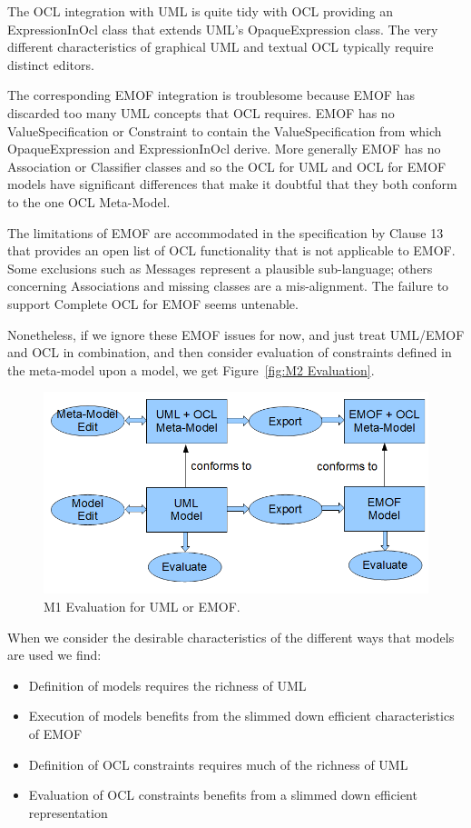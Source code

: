 \documentclass{eceasst}
\begin{document}
The OCL integration with UML is quite tidy with OCL providing an ExpressionInOcl class that extends UML's OpaqueExpression class. The very different characteristics of graphical UML and textual OCL typically require distinct editors.

The corresponding EMOF integration is troublesome because EMOF has discarded too many UML concepts that OCL requires. EMOF has no ValueSpecification or Constraint to contain the ValueSpecification from which OpaqueExpression and ExpressionInOcl derive. More generally EMOF has no Association or Classifier classes and so the OCL for UML and OCL for EMOF models have significant differences that make it doubtful that they both conform to the one OCL Meta-Model.

The limitations of EMOF are accommodated in the specification by Clause 13 that provides an open list of OCL functionality that is not applicable to EMOF. Some exclusions such as Messages represent a plausible sub-language; others concerning Associations and missing classes are a mis-alignment. The failure to support Complete OCL for EMOF seems untenable.

Nonetheless, if we ignore these EMOF issues for now, and just treat UML/EMOF and OCL in combination, and then consider evaluation of constraints defined in the meta-model upon a model, we get Figure~\ref{fig:M2 Evaluation}.

\begin{figure}
  \begin{center}
    \includegraphics[width=4.5in]{M2Evaluation.png}
  \end{center}
  \caption{M1 Evaluation for UML or EMOF.}
  \label{fig:M2Evaluation}
\end{figure}

When we consider the desirable characteristics of the different ways that models are used we find:
\begin{itemize}
\item Definition of models requires the richness of UML
\item Execution of models benefits from the slimmed down efficient characteristics of EMOF 
\item Definition of OCL constraints requires much of the richness of UML
\item Evaluation of OCL constraints benefits from a slimmed down efficient representation
\end{itemize}
\end{document}
